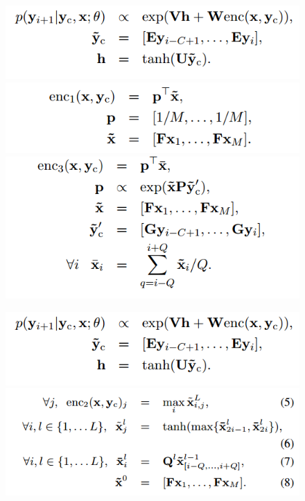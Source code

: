 \documentclass[xcolor={table}]{beamer}
\begin{document}
\begin{frame}{\cite{rush2015neural}}
\begin{figure}[h]
\centering
\includegraphics[scale=.3]{images/mod-rush15} \\
\includegraphics[scale=.3]{images/bow-rush15} 
\includegraphics[scale=.3]{images/att-rush15} 
\end{figure}
\end{frame}

\begin{frame}{\cite{rush2015neural}}
\begin{figure}[h]
\centering
\includegraphics[scale=.3]{images/mod-rush15} \\
\includegraphics[scale=.3]{images/con-rush15} \\
\end{figure}
\end{frame}
\end{document}
